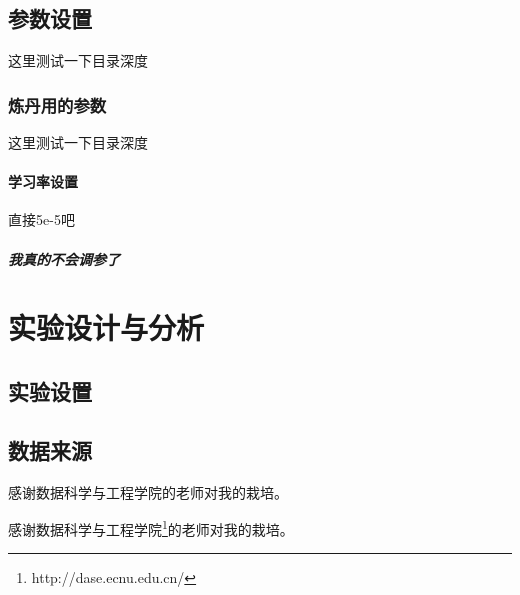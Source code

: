 \documentclass{ecnuthesis}
\begin{document}
\section{参数设置}

这里测试一下目录深度

\subsection{炼丹用的参数}

这里测试一下目录深度

\subsubsection{学习率设置}

直接5e-5吧

\paragraph{我真的不会调参了}

\chapter{实验设计与分析}

\section{实验设置}

\section{数据来源}

\backmatter
\printbibliography

\nocite{zhang2021dive}
\nocite{Goodfellow-et-al-2016}
\nocite{qiu2020nndl}

\begin{appendix}
 感谢数据科学与工程学院的老师对我的栽培。
\end{appendix}

\begin{acknowledgement}

感谢数据科学与工程学院\footnote{http://dase.ecnu.edu.cn/}的老师对我的栽培。
\end{acknowledgement}
\end{document}
